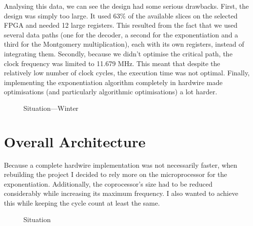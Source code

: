 \documentclass[a4paper]{article}
\begin{document}
Analysing this data, we can see the design had some serious drawbacks. First, the design was simply too large. It used 63\% of the available slices on the selected FPGA and needed 12 large registers. This resulted from the fact that we used several data paths (one for the decoder, a second for the exponentiation and a third for the Montgomery multiplication), each with its own registers, instead of integrating them. Secondly, because we didn't optimise the critical path, the clock frequency was limited to 11.679 MHz. This meant that despite the relatively low number of clock cycles, the execution time was not optimal. Finally, implementing the exponentiation algorithm completely in hardwire made optimisations (and particularly algorithmic optimisations) a lot harder.

\begin{figure}[H]
	\caption{Situation---Winter}
	\label{fig:situation_winter}
\end{figure}

\section{Overall Architecture}
\label{sec:overall_architecture}

Because a complete hardwire implementation was not necessarily faster, when rebuilding the project I decided to rely more on the microprocessor for the exponentiation. Additionally, the coprocessor's size had to be reduced considerably while increasing its maximum frequency. I also wanted to achieve this while keeping the cycle count at least the same.\\

\begin{figure}[H]
	\caption{Situation}
	\label{fig:situation_winter}
\end{figure}
\end{document}
